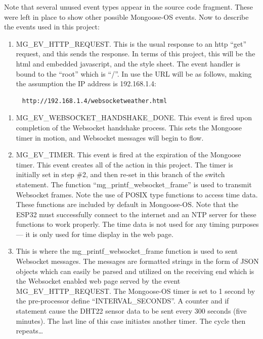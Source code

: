 \documentclass[letterpaper,]{book}
\providecommand{\tightlist}{%
  \setlength{\itemsep}{0pt}\setlength{\parskip}{0pt}}
\begin{document}
Note that several unused event types appear in the source code fragment.
These were left in place to show other possible Mongoose-OS events. Now
to describe the events used in this project:

\begin{enumerate}
\def\labelenumi{\arabic{enumi}.}
\tightlist
\item
  MG\_EV\_HTTP\_REQUEST. This is the usual response to an http ``get''
  request, and this sends the response. In terms of this project, this
  will be the html and embedded javascript, and the style sheet. The
  event handler is bound to the ``root'' which is ``/''. In use the URL
  will be as follows, making the assumption the IP address is
  192.168.1.4:
\end{enumerate}

\begin{verbatim}
     http://192.168.1.4/websocketweather.html
\end{verbatim}

\begin{enumerate}
\def\labelenumi{\arabic{enumi}.}
\setcounter{enumi}{1}
\tightlist
\item
  MG\_EV\_WEBSOCKET\_HANDSHAKE\_DONE. This event is fired upon
  completion of the Websocket handshake process. This sets the Mongoose
  timer in motion, and Websocket messages will begin to flow.
\item
  MG\_EV\_TIMER. This event is fired at the expiration of the Mongoose
  timer. This event creates all of the action in this project. The timer
  is initially set in step \#2, and then re-set in this branch of the
  switch statement. The function ``mg\_printf\_websocket\_frame'' is
  used to transmit Websocket frames. Note the use of POSIX type
  functions to access time data. These functions are included by default
  in Mongoose-OS. Note that the ESP32 must successfully connect to the
  internet and an NTP server for these functions to work properly. The
  time data is not used for any timing purposes--- it is only used for
  time display in the web page.
\item
  This is where the mg\_printf\_websocket\_frame function is used to
  sent Websocket messages. The messages are formatted strings in the
  form of JSON objects which can easily be parsed and utilized on the
  receiving end which is the Websocket enabled web page served by the
  event MG\_EV\_HTTP\_REQUEST. The Mongoose-OS timer is set to 1 second
  by the pre-processor define ``INTERVAL\_SECONDS''. A counter and if
  statement cause the DHT22 sensor data to be sent every 300 seconds
  (five minutes). The last line of this case initiates another timer.
  The cycle then repeats\ldots{}
\end{enumerate}
\end{document}
